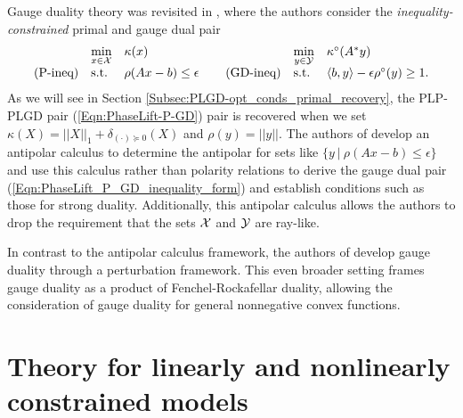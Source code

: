 \begin{enumerate}
Gauge duality theory was revisited in \cite{DBLP:journals/siamjo/FriedlanderMP14}, where the authors consider the \textit{inequality-constrained} primal and gauge dual pair
\begin{equation} 			\label{Eqn:PhaseLift_P_GD_inequality_form}
\begin{array}{lllllll}
	&	\min\limits_{\substack{x \in {\mathcal X}}}
		&	\kappa(x)
			&
				&	\min\limits_{\substack{y \in {\mathcal Y}}}
					&	\kappa^\circ(A^*y)
						\\
\textnormal{(P-ineq)}
	&	\textnormal{s.t.}
		& 	\rho(Ax-b) \leq \epsilon
			&	\hspace{0.4cm} 	\textnormal{(GD-ineq)}
				&	\textnormal{s.t.}
					&	\langle b, y \rangle - \epsilon \rho^\circ(y) \geq 1.
\end{array}
\end{equation}
As we will see in Section \ref{Subsec:PLGD-opt_conds_primal_recovery}, the PLP-PLGD pair (\ref{Eqn:PhaseLift-P-GD}) pair is recovered when we set $\kappa(X) = ||X||_1 + \delta_{(\cdot) \succeq 0}(X)$ and $\rho(y) = ||y||$.  The authors of \cite{DBLP:journals/siamjo/FriedlanderMP14} develop an antipolar calculus to determine the antipolar for sets like $\{ y \ | \ \rho(Ax-b) \leq \epsilon \}$ and use this calculus rather than polarity relations to derive the gauge dual pair (\ref{Eqn:PhaseLift_P_GD_inequality_form}) and establish conditions such as those for strong duality.  Additionally, this antipolar calculus allows the authors to drop the requirement that the sets ${\mathcal X}$ and ${\mathcal Y}$ are ray-like.

In contrast to the antipolar calculus framework, the authors of \cite{aravkin2017foundations} develop gauge duality through a perturbation framework.  This even broader setting frames gauge duality as a product of Fenchel-Rockafellar duality, allowing the consideration of gauge duality for 
general nonnegative convex functions.






\end{enumerate}





\section{Theory for linearly and nonlinearly constrained models} 			\label{Subsec:PLGD-theory}


